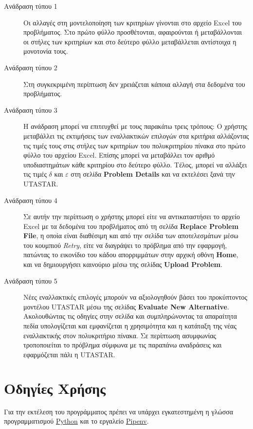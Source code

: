 \documentclass[11pt,a4paper,titlepage]{article}
\numberwithin{equation}{section}
\begin{document}
\begin{description}
	\item[Ανάδραση τύπου 1]
	Οι αλλαγές στη μοντελοποίηση των κριτηρίων γίνονται στο αρχείο Excel του προβλήματος. Στο πρώτο φύλλο προσθέτονται, αφαιρούνται ή μεταβάλλονται οι στήλες των κριτηρίων και στο δεύτερο φύλλο μεταβάλλεται αντίστοιχα η μονοτονία τους.
	\item[Ανάδραση τύπου 2]
	Στη συγκεκριμένη περίπτωση δεν χρειάζεται κάποια αλλαγή στα δεδομένα του προβλήματος.
	\item[Ανάδραση τύπου 3]
    Η ανάδραση μπορεί να επιτευχθεί με τους παρακάτω τρεις τρόπους: Ο χρήστης μεταβάλλει τις εκτιμήσεις των εναλλακτικών επιλογών στα κριτήρια αλλάζοντας τις τιμές τους στις στήλες των κριτηρίων του πολυκριτηρίου πίνακα στο πρώτο φύλλο του αρχείου Excel. Επίσης μπορεί να μεταβάλλει τον αριθμό υποδιαστημάτων κάθε κριτηρίου στο δεύτερο φύλλο. Τέλος, μπορεί να αλλάξει τις τιμές $ \delta $ και $ \varepsilon $ στη σελίδα \textbf{Problem Details} και να εκτελέσει ξανά την UTASTAR.
	\item[Ανάδραση τύπου 4]
    Σε αυτήν την περίπτωση ο χρήστης μπορεί είτε να αντικαταστήσει το αρχείο Excel με τα δεδομένα του προβλήματος από τη σελίδα \textbf{Replace Problem File}, η οποία είναι διαθέσιμη και από την σελίδα των αποτελεσμάτων μέσω του κουμπιού \textit{Retry}, είτε να διαγράψει το πρόβλημα από την εφαρμογή, πατώντας το εικονίδιο του κάδου απορριμμάτων στην αρχική οθόνη \textbf{Home}, και να δημιουργήσει καινούριο μέσω της σελίδας \textbf{Upload Problem}.
	\item[Ανάδραση τύπου 5]
	Νέες εναλλακτικές επιλογές μπορούν να αξιολογηθούν βάσει του προκύπτοντος μοντέλου UTASTAR μέσω της σελίδας \textbf{Evaluate New Alternative}. Ακολουθώντας τις οδηγίες στην σελίδα και συμπληρώνοντας τα απαραίτητα πεδία υπολογίζεται και εμφανίζεται η χρησιμότητα και η κατάταξη της νέας εναλλακτικής στον πολυκριτήριο πίνακα. Σε περίπτωση ασυμφωνίας τροποποιείται το πρόβλημα σύμφωνα με τις παραπάνω αναδράσεις και εφαρμόζεται πάλι η UTASTAR.
\end{description}

\section{Οδηγίες Χρήσης}
\label{sec:instructions}

Για την εκτέλεση του προγράμματος πρέπει να υπάρχει εγκατεστημένη η γλώσσα προγραμματισμού \href{https://www.python.org/downloads/}{Python} και το εργαλείο \href{https://pipenv.pypa.io/en/latest/install/}{Pipenv}.
\end{document}
